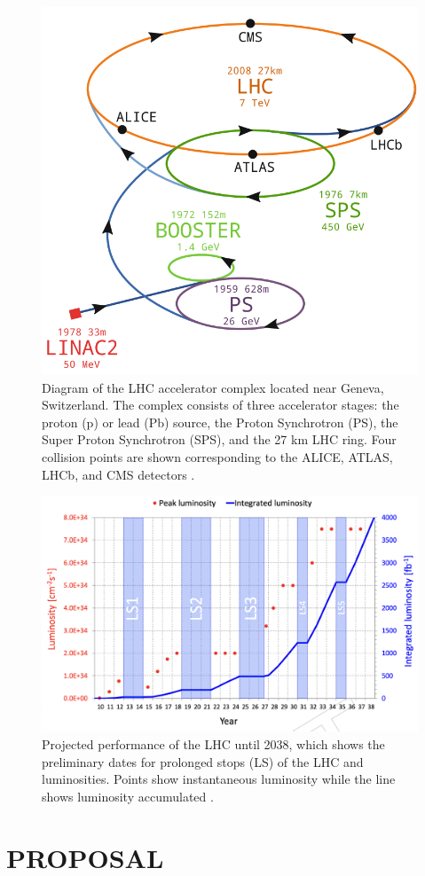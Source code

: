 \documentclass[final,12p]{article}
\begin{document}
 
\begin{figure}[H]
  \centering
  \includegraphics[width=0.6\columnwidth]{./LHCcomplex.png}
  \caption{
    Diagram of the LHC accelerator complex located near Geneva, Switzerland. The complex consists of three accelerator stages: the proton (p) or lead (Pb) source, the Proton Synchrotron (PS), the Super Proton Synchrotron (SPS), and the 27 km LHC ring. Four collision points are shown corresponding to the ALICE, ATLAS, LHCb, and CMS detectors  \cite{Mobs:2684277}.
  }
  \label{figure2}
\end{figure}


\begin{figure}[H]
  \centering
  \includegraphics[width=0.8\columnwidth]{./HLLHCLumi.png}
  \caption{
    Projected performance of the LHC until 2038, which shows the preliminary dates for prolonged stops (LS) of the LHC and luminosities. Points show instantaneous luminosity while the line shows luminosity accumulated \cite{collaborations2019report}.
  }
  \label{figure6}
\end{figure}



\section{PROPOSAL}
\end{document}
